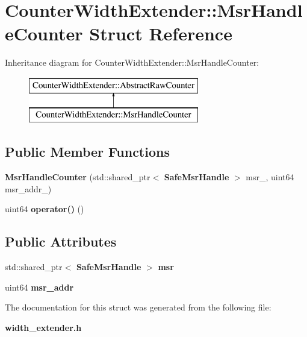 \section{Counter\+Width\+Extender\+:\+:Msr\+Handle\+Counter Struct Reference}
\label{structCounterWidthExtender_1_1MsrHandleCounter}
Inheritance diagram for Counter\+Width\+Extender\+:\+:Msr\+Handle\+Counter\+:\begin{figure}[H]
\begin{center}
\leavevmode
\includegraphics[height=2.000000cm]{structCounterWidthExtender_1_1MsrHandleCounter}
\end{center}
\end{figure}
\subsection*{Public Member Functions}
\begin{DoxyCompactItemize}
\item 
{\bfseries Msr\+Handle\+Counter} (std\+::shared\+\_\+ptr$<$ {\bf Safe\+Msr\+Handle} $>$ msr\+\_\+, uint64 msr\+\_\+addr\+\_\+)\label{structCounterWidthExtender_1_1MsrHandleCounter_a293eeb777712b8dff89999db5d671bc9}

\item 
uint64 {\bfseries operator()} ()\label{structCounterWidthExtender_1_1MsrHandleCounter_af6a1d4c47ab99efc52e87805b20457fc}

\end{DoxyCompactItemize}
\subsection*{Public Attributes}
\begin{DoxyCompactItemize}
\item 
std\+::shared\+\_\+ptr$<$ {\bf Safe\+Msr\+Handle} $>$ {\bfseries msr}\label{structCounterWidthExtender_1_1MsrHandleCounter_a221afc246d9a2b0d9e902650fe28b9a1}

\item 
uint64 {\bfseries msr\+\_\+addr}\label{structCounterWidthExtender_1_1MsrHandleCounter_a5522d6a788192c2cb69b8d0c4fc0a9a1}

\end{DoxyCompactItemize}


The documentation for this struct was generated from the following file\+:\begin{DoxyCompactItemize}
\item 
{\bf width\+\_\+extender.\+h}\end{DoxyCompactItemize}
